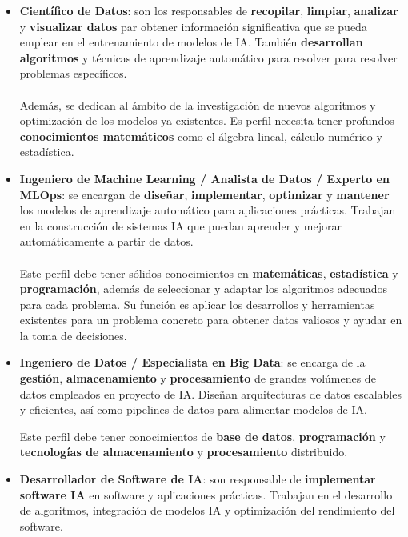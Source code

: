 \begin{itemize}
	\item \textbf{Científico de Datos}: son los responsables de \textbf{recopilar}, \textbf{limpiar}, \textbf{analizar} y \textbf{visualizar datos} par obtener información significativa que se pueda emplear en el entrenamiento de modelos de IA. También \textbf{desarrollan algoritmos} y técnicas de aprendizaje automático para resolver para resolver problemas específicos. \\
	\\
	Además, se dedican al ámbito de la investigación de nuevos algoritmos y optimización de los modelos ya existentes. Es perfil necesita tener profundos \textbf{conocimientos matemáticos} como el álgebra lineal, cálculo numérico y estadística.
	
	\item \textbf{Ingeniero de Machine Learning / Analista de Datos / Experto en MLOps}: se encargan de \textbf{diseñar}, \textbf{implementar}, \textbf{optimizar} y \textbf{mantener} los modelos de aprendizaje automático para aplicaciones prácticas. Trabajan en la construcción de sistemas IA que puedan aprender y mejorar automáticamente a partir de datos.\\
	\\
	Este perfil debe tener sólidos conocimientos en \textbf{matemáticas}, \textbf{estadística} y \textbf{programación}, además de seleccionar y adaptar los algoritmos adecuados para cada problema. Su función es aplicar los desarrollos y herramientas existentes para un problema concreto para obtener datos valiosos y ayudar en la toma de decisiones. 
	
	\item \textbf{Ingeniero de Datos / Especialista en Big Data}: se encarga de la \textbf{gestión}, \textbf{almacenamiento} y \textbf{procesamiento} de grandes volúmenes de datos empleados en proyecto de IA. Diseñan arquitecturas de datos escalables y eficientes, así como \gls{pipelines} de datos para alimentar modelos de IA.
	
	Este perfil debe tener conocimientos de \textbf{base de datos}, \textbf{programación} y \textbf{tecnologías de almacenamiento} y \textbf{procesamiento} distribuido.
	
	\item \textbf{Desarrollador de Software de IA}: son responsable de \textbf{implementar software IA} en software y aplicaciones prácticas. Trabajan en el desarrollo de algoritmos, integración de modelos IA y optimización del rendimiento del software.
	

\end{itemize}
